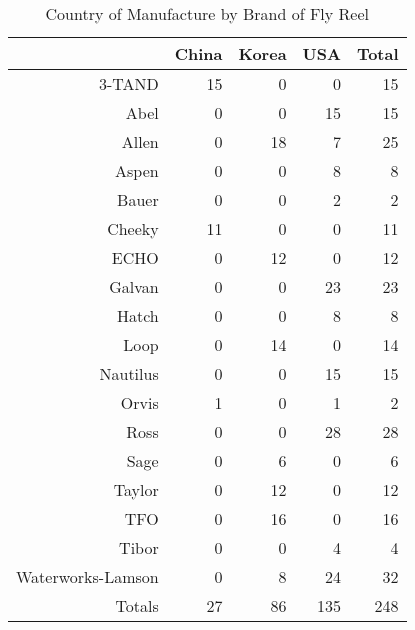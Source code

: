 \begin{table}[ht]
\centering
\begin{tabular}{rrrrr}
  \hline
 & China & Korea & USA & Total \\ 
  \hline
3-TAND & 15 & 0 & 0 & 15 \\ 
  Abel & 0 & 0 & 15 & 15 \\ 
  Allen & 0 & 18 & 7 & 25 \\ 
  Aspen & 0 & 0 & 8 & 8 \\ 
  Bauer & 0 & 0 & 2 & 2 \\ 
  Cheeky & 11 & 0 & 0 & 11 \\ 
  ECHO & 0 & 12 & 0 & 12 \\ 
  Galvan & 0 & 0 & 23 & 23 \\ 
  Hatch & 0 & 0 & 8 & 8 \\ 
  Loop & 0 & 14 & 0 & 14 \\ 
  Nautilus & 0 & 0 & 15 & 15 \\ 
  Orvis & 1 & 0 & 1 & 2 \\ 
  Ross & 0 & 0 & 28 & 28 \\ 
  Sage & 0 & 6 & 0 & 6 \\ 
  Taylor & 0 & 12 & 0 & 12 \\ 
  TFO & 0 & 16 & 0 & 16 \\ 
  Tibor & 0 & 0 & 4 & 4 \\ 
  Waterworks-Lamson & 0 & 8 & 24 & 32 \\ 
  Totals & 27 & 86 & 135 & 248 \\ 
   \hline
\end{tabular}
\caption{Country of Manufacture by Brand of Fly Reel} 
\label{tab:country_by_brand}
\end{table}
